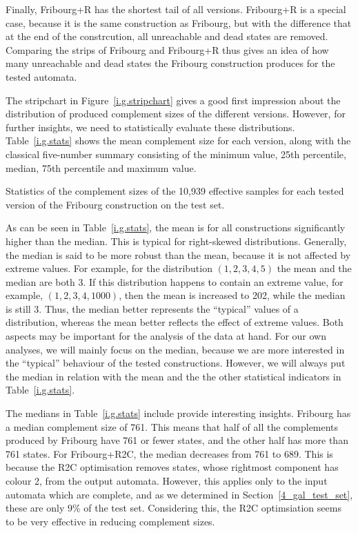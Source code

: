 Finally, Fribourg+R has the shortest tail of all versions. Fribourg+R is a special case, because it is the same construction as Fribourg, but with the difference that at the end of the constrcution, all unreachable and dead states are removed. Comparing the strips of Fribourg and Fribourg+R thus gives an idea of how many unreachable and dead states the Fribourg construction produces for the tested automata.

The stripchart in Figure~\ref{i.g.stripchart} gives a good first impression about the distribution of produced complement sizes of the different versions. However, for further insights, we need to statistically evaluate these distributions. Table~\ref{i.g.stats} shows the mean complement size for each version, along with the classical five-number summary consisting of the minimum value, 25th percentile, median, 75th percentile and maximum value.

\begin{table}[ht]
\centering

\caption{Statistics of the complement sizes of the 10,939 effective samples for each tested version of the Fribourg construction on the \goal{} test set.}
\label{i.g.stats}
\end{table}

As can be seen in Table~\ref{i.g.stats}, the mean is for all constructions significantly higher than the median. This is typical for right-skewed distributions. Generally, the median is said to be more robust than the mean, because it is not affected by extreme values. For example, for the distribution $(1,2,3,4,5)$ the mean and the median are both 3. If this distribution happens to contain an extreme value, for example, $(1,2,3,4,1000)$, then the mean is increased to 202, while the median is still 3. Thus, the median better represents the ``typical'' values of a distribution, whereas the mean better reflects the effect of extreme values. Both aspects may be important for the analysis of the data at hand. For our own analyses, we will mainly focus on the median, because we are more interested in the ``typical'' behaviour of the tested constructions. However, we will always put the median in relation with the mean and the the other statistical indicators in Table~\ref{i.g.stats}.

The medians in Table~\ref{i.g.stats} include provide interesting insights. Fribourg has a median complement size of 761. This means that half of all the complements produced by Fribourg have 761 or fewer states, and the other half has more than 761 states. For Fribourg+R2C, the median decreases from 761 to 689. This is because the R2C optimisation removes states, whose rightmost component has colour 2, from the output automata. However, this applies only to the input automata which are complete, and as we determined in Section~\ref{4_gal_test_set}, these are only 9\% of the \goal{} test set. Considering this, the R2C optimsiation seems to be very effective in reducing complement sizes.

